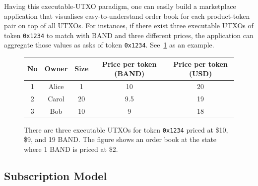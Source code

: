 \documentclass[letterpaper,11pt]{article}
\begin{document}
Having this executable-UTXO paradigm, one can easily build a marketplace application that visualises easy-to-understand order book for each product-token pair on top of all UTXOs. For instances, if there exist three executable UTXOs of token {\tt 0x1234} to match with BAND and three different prices, the application can aggregate those values as asks of token {\tt 0x1234}. See~\cref{fig:marketplace-ex} as an example.

\begin{figure}[!h]
\centering
{}
\begin{tabular}{ c | c | c | c | c }
No & Owner & Size & Price per token (BAND) & Price per token (USD) \\ \hline
1& Alice & 1 & 10 & 20 \\
2 & Carol & 20 & 9.5 & 19 \\
3 &Bob & 10 & 9 & 18 \\
\end{tabular}
\caption{There are three executable UTXOs for token {\tt 0x1234} priced at \$10, \$9, and 19 BAND. The figure shows an order book at the state where 1 BAND is priced at \$2.}
\label{fig:marketplace-ex}
\end{figure}

\subsection{Subscription Model}
\end{document}
